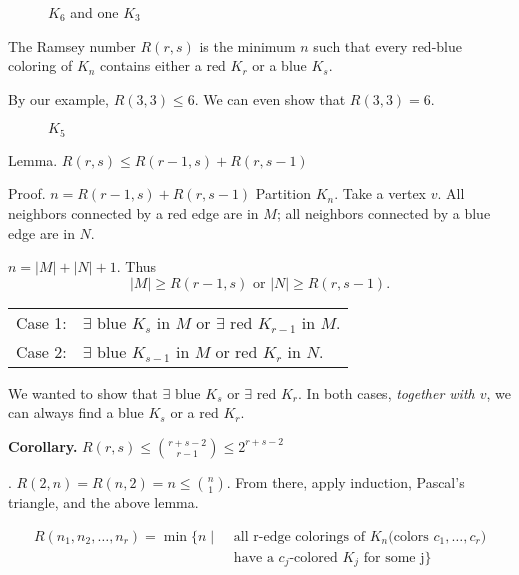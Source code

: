 \begin{figure}[htb]
  \centering
  \caption{$K_6$ and one $K_3$}
\end{figure}
\FloatBarrier


\begin{definition}
The Ramsey number $R(r,s)$ is the minimum $n$ such that
every red-blue coloring of $K_n$ contains either a red $K_r$ or a blue $K_s$.
\end{definition}

By our example, $R(3,3) ≤ 6$. We can even show that $R(3,3) = 6$.

\begin{figure}[htb]
  \centering
  \caption{$K_5$}
\end{figure}

Lemma. $R(r,s) ≤ R(r-1, s) + R(r, s-1)$

Proof. $n = R(r-1, s) + R(r, s-1)$
Partition $K_n$. Take a vertex $v$. All neighbors connected by a red edge are in $M$; all neighbors connected by a blue edge are in $N$.

$n = |M|+|N|+1$. Thus
\[
  |M| ≥ R(r-1, s) \text{ or } |N| ≥ R(r, s-1).
\]

\begin{tabular}{ll}
  Case 1: & $\exists$ blue $K_s$ in $M$ or $\exists$ red $K_{r-1}$ in $M$. \\
  Case 2: & $\exists$ blue $K_{s-1}$ in $M$ or red $K_r$ in $N$.
\end{tabular}

We wanted to show that $\exists$ blue $K_s$ or $\exists$ red $K_r$.
In both cases, \emph{together with $v$}, we can always find a blue $K_s$ or a red $K_r$.

\textbf{Corollary.} $R(r,s) ≤ {r+s-2 \choose r-1} ≤ 2^{r+s-2}$

\Proof. $R(2,n) = R(n,2) = n ≤ {n \choose 1}$. From there, apply induction, Pascal's triangle, and the above lemma.

\begin{definition}
\begin{align*}
  R(n_1,n_2,\ldots,n_r) = \min \{ n \mid
    &\text{ all r-edge colorings of $K_n$
      (colors $c_1,\ldots,c_r$)} \\
    & \text{ have a $c_j$-colored $K_j$ for some j}\}
\end{align*}
\end{definition}











